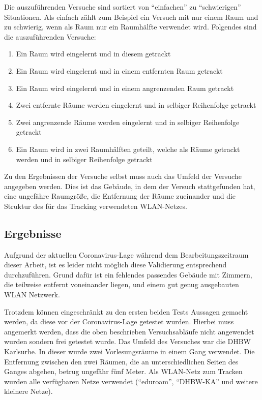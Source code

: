 Die auszuführenden Versuche sind sortiert von \enquote{einfachen} zu \enquote{schwierigen} Situationen.
Als einfach zählt zum Beispiel ein Versuch mit nur einem Raum und zu schwierig, wenn als Raum nur ein
Raumhälfte verwendet wird.
Folgendes sind die auszuführenden Versuche:
\begin{enumerate}
	\item Ein Raum wird eingelernt und in diesem getrackt
	\item Ein Raum wird eingelernt und in einem entfernten Raum getrackt
	\item Ein Raum wird eingelernt und in einem angrenzenden Raum getrackt
	\item Zwei entfernte Räume werden eingelernt und in selbiger Reihenfolge getrackt
	\item Zwei angrenzende Räume werden eingelernt und in selbiger Reihenfolge getrackt
	\item Ein Raum wird in zwei Raumhälften geteilt, welche als Räume getrackt werden und in selbiger Reihenfolge getrackt
\end{enumerate}

Zu den Ergebnissen der Versuche selbst muss auch das Umfeld der Versuche angegeben werden.
Dies ist das Gebäude, in dem der Versuch stattgefunden hat, eine ungefähre Raumgröße, die Entfernung der Räume zueinander
und die Struktur des für das Tracking verwendeten \gls{WLAN}-Netzes.

\subsection{Ergebnisse}
Aufgrund der aktuellen Coronavirus-Lage \cite{bw2020} \cite{dhbwka2020} während dem Bearbeitungszeitraum dieser Arbeit,
ist es leider nicht möglich diese Validierung entsprechend durchzuführen.
Grund dafür ist ein fehlendes passendes Gebäude mit Zimmern, die teilweise entfernt voneinander liegen, und einem gut
genug ausgebauten \gls{WLAN} Netzwerk. 

Trotzdem können eingeschränkt zu den ersten beiden Tests Aussagen gemacht werden, da diese vor der Coronavirus-Lage
getestet wurden.
Hierbei muss angemerkt werden, dass die oben beschrieben Versuchsabläufe nicht angewendet wurden sondern frei getestet wurde.
Das Umfeld des Versuches war die \gls{DHBW} Karlsurhe.
In dieser wurde zwei Vorlesungsräume in einem Gang verwendet.
Die Entfernung zwischen den zwei Räumen, die an unterschiedlichen Seiten des Ganges abgehen, betrug ungefähr fünf Meter.
Als \gls{WLAN}-Netz zum Tracken wurden alle verfügbaren Netze verwendet (\enquote{eduroam}, \enquote{DHBW-KA} und weitere kleinere Netze).

